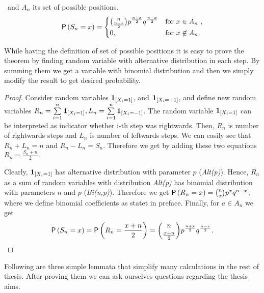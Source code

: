 \begin{thm}\label{thm-probability_position_time}
 \Lrw\ and $A_n$ its set of possible positions.
 \[
 \operatorname{\mathsf{P}} \left( S_n=x \right) =
 \begin{cases}
 \binom{n}{\frac{n+x}{2}}p^{\frac{n+x}{2}}q^{\frac{n-x}{2}} & \text{for $x \in A_n$ },\\
 0, & \text{for $x \not\in A_n$}.
 \end{cases}
 \]

\end{thm}

\begin{rem}
  While having the definition of set of possible positions it is easy to prove the theorem by finding random variable with alternative distribution in each step. By summing them we get a variable with binomial distribution and then we simply modify the result to get desired probability.
\end{rem}

\begin{proof}
  Consider random variables $\mathbf{1}_{[X_i=1]}$, and
   $\mathbf{1}_{[X_i=-1]}$, and define new random variables
   $R_n=\suma \indikator{X_i=1}, L_n=\suma \indikator{X_i=-1}$.  The
   random variable $\mathbf{1}_{[X_i=1]}$ can be interpreted as indicator
   whether i-th step was rightwards. Then, $R_n$ is number of
   rightwards steps and $L_n$ is number of leftwards steps. We can
   easily see that $R_n+L_n=n$ and $R_n-L_n=S_n$.  Therefore we get by
   adding these two equations $R_n=\frac{S_n+n}{2}.$

   Clearly, $\mathbf{1}_{[X_i=1]}$ has alternative distribution with
   parameter $p$ (\textit{Alt(p)}). Hence, $R_n$ as a sum of \iid
   random variables with distribution \textit{Alt(p)} has binomial
   distribution with parameters $n$ and $p$ (\textit{Bi(n,p)}).
   Therefore we get
   $\operatorname{\mathsf{P}} \left(R_n=x \right) =\binom{n}{x}p^{x}q^{n-x}$, where we define
  binomial coefficients as statet in preface.
   Finally, for $a \in A_n$ we get
   \[
     \operatorname{\mathsf{P}} \left( S_n=x \right) =\operatorname{\mathsf{P}}\left( R_n=\frac{x+n}{2} \right) =
     \binom{n}{\frac{x+n}{2}}p^{\frac{n+x}{2}}q^{\frac{n-x}{2}}.
   \]
\end{proof}

\begin{rem}
  Following are three simple lemmata that simplify many calculations in the rest of thesis. After proving them we can ask ourselves questions regarding the thesis aims.
\end{rem}

